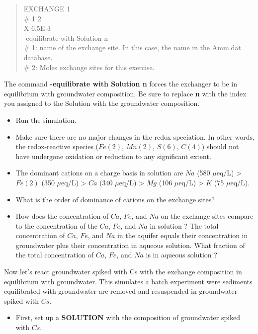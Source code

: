 \begin{quote}
{\color{red}EXCHANGE 1 \\
\# 1	2 \\
X	6.5E-3 \\
-equilibrate with Solution n  \\
\# 1: name of the exchange site. In this case, the name in the Amm.dat database. \\
\# 2: Moles exchange sites for this exercise. }\\
\end{quote}

The command {\color{red}\textbf{-equilibrate with Solution n}} 
forces the exchanger to be in equilibrium with groundwater composition.  
Be sure to  replace {\color{red}\textbf{n}} with the index you assigned 
to the Solution with the groundwater composition.  

\begin{itemize}
\item Run the simulation.
\item Make sure there are no major changes in the redox speciation.
In other words, the redox-reactive species ($Fe(2)$, $Mn(2)$, $S(6)$, $C(4)$) 
should not have undergone oxidation or reduction to any significant extent.  
\item The dominant cations on a charge basis in solution 
are $Na$ (580 $\mu$eq/L) > $Fe(2)$ (350 $\mu$eq/L) 
  > $Ca$ (340 $\mu$eq/L) > $Mg$ (106 $\mu$eq/L) > $K$ (75 $\mu$eq/L). 
\item What is the order of dominance of cations on the exchange sites?
\item How does the concentration of $Ca$, $Fe$, and $Na$ on the exchange 
sites compare to the concentration of the $Ca$, $Fe$, and $Na$ in solution ?  
The total concentration of $Ca$, $Fe$, and $Na$ in the aquifer equals their 
concentration in groundwater plus their concentration in aqueous solution.  
What fraction of the total concentration of $Ca$, $Fe$, and $Na$ is in aqueous solution ?
\end{itemize}

Now let's react groundwater spiked with Cs with the exchange 
composition in equilibrium with groundwater.  
This simulates a batch experiment were sediments equilibrated 
with groundwater are removed and resuspended in groundwater spiked with $Cs$.

\begin{itemize}
\item First, set up a {\color{red}\textbf{SOLUTION}} 
with the composition of groundwater spiked with $Cs$.
\end{itemize}

